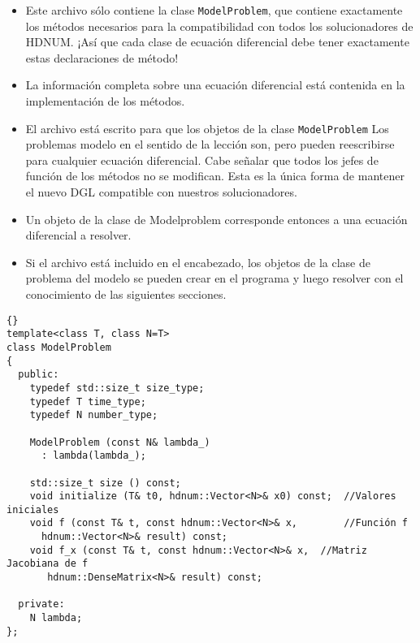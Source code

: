 \documentclass[a4paper,11pt]{article}
\theoremstyle{definition}
\begin{document}
\begin{itemize}
\item Este archivo sólo contiene la clase
  \lstinline{ModelProblem}, que contiene exactamente los métodos necesarios para la compatibilidad con todos los solucionadores de HDNUM. ¡Así que cada clase de ecuación diferencial debe tener exactamente estas declaraciones de método!
\item La información completa sobre una ecuación diferencial está contenida en la implementación de los métodos.
\item El archivo está escrito para que los objetos de la clase
  \lstinline{ModelProblem} Los problemas modelo en el sentido de la lección son, pero pueden reescribirse para cualquier ecuación diferencial. Cabe señalar que todos los jefes de función de los métodos no se modifican. Esta es la única forma de mantener el nuevo DGL compatible con nuestros solucionadores.
\item Un objeto de la clase de Modelproblem corresponde entonces a una ecuación diferencial a resolver.
\item Si el archivo está incluido en el encabezado, los objetos de la clase de problema del modelo se pueden crear en el programa y luego resolver con el conocimiento de las siguientes secciones.
\end{itemize}

{\footnotesize{\begin{lstlisting}{}
template<class T, class N=T>
class ModelProblem
{
  public:
    typedef std::size_t size_type;
    typedef T time_type;
    typedef N number_type;

    ModelProblem (const N& lambda_)
      : lambda(lambda_);

    std::size_t size () const;
    void initialize (T& t0, hdnum::Vector<N>& x0) const;  //Valores iniciales
    void f (const T& t, const hdnum::Vector<N>& x,        //Función f
      hdnum::Vector<N>& result) const;
    void f_x (const T& t, const hdnum::Vector<N>& x,  //Matriz Jacobiana de f
       hdnum::DenseMatrix<N>& result) const;

  private:
    N lambda;
};
\end{lstlisting}}}
\end{document}
